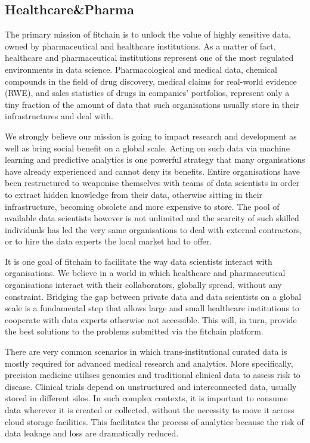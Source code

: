 \documentclass[12pt, a4paper,titlepage]{extreport}
\begin{document}
\subsection{Healthcare\&Pharma}
The primary mission of fitchain is to unlock the value of highly sensitive data, owned by pharmaceutical and healthcare institutions. As a matter of fact, healthcare and pharmaceutical institutions represent one of the most regulated environments in data science. Pharmacological and medical data, chemical compounds in the field of drug discovery, medical claims for real-world evidence (RWE), and sales statistics of drugs in companies' portfolios, represent only a tiny fraction of the amount of data that such organisations usually store in their infrastructures and deal with.

We strongly believe our mission is going to impact research and development as well as bring social benefit on a global scale.  
Acting on such data via machine learning and predictive analytics is one powerful strategy that many organisations have already experienced and cannot deny its benefits. Entire organisations have been restructured to weaponise themselves with teams of data scientists in order to extract hidden knowledge from their data, otherwise sitting in their infrastructure, becoming obsolete and more expensive to store. 
The pool of available data scientists however is not unlimited and the scarcity of such skilled individuals has led the very same organisations to deal with external contractors, or to hire the data experts the local market had to offer. 

It is one goal of fitchain to facilitate the way data scientists interact with organisations. We believe in a world in which healthcare and pharmaceutical organisations interact with their collaborators, globally spread, without any constraint. Bridging the gap between private data and data scientists on a global scale is a fundamental step that allows large and small healthcare institutions to cooperate with data experts otherwise not accessible. This will, in turn, provide the best solutions to the problems submitted via the fitchain platform.

There are very common scenarios in which trans-institutional curated data is mostly required for advanced medical research and analytics. More specifically, precision medicine utilises genomics and traditional clinical data to assess risk to disease. Clinical trials depend on unstructured and interconnected data, usually stored in different silos. In such complex contexts, it is important to consume data wherever it is created or collected, without the necessity to move it across cloud storage facilities. This facilitates the process of analytics because the risk of data leakage and loss are dramatically reduced. 
\end{document}
